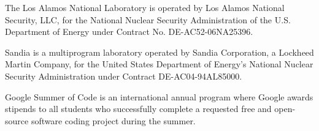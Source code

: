 The Los Alamos National Laboratory is operated by Los Alamos National Security,
LLC, for the National Nuclear Security Administration of the U.S. Department of
Energy under Contract No. DE-AC52-06NA25396.

Sandia is a multiprogram laboratory operated by Sandia Corporation, a Lockheed Martin Company, for the United States Department of Energy's National Nuclear Security Administration under Contract DE-AC04-94AL85000.

Google Summer of Code is an international annual program where Google awards stipends to all students who successfully complete a requested free and open-source software coding project during the summer.
